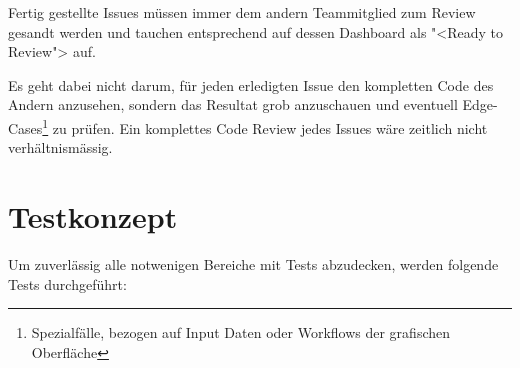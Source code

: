 		Fertig gestellte Issues müssen immer dem andern Teammitglied
		zum Review gesandt werden und tauchen entsprechend auf dessen
		Dashboard als "<Ready to Review"> auf.
		
		Es geht dabei nicht darum, 
		für jeden erledigten Issue den kompletten Code des Andern anzusehen, 
		sondern das Resultat grob anzuschauen und eventuell
		Edge-Cases\footnote{Spezialfälle, bezogen auf Input Daten oder 
		Workflows der grafischen Oberfläche} zu prüfen. 
		Ein komplettes Code Review jedes Issues wäre zeitlich nicht verhältnismässig.
		
		
		\section{Testkonzept}
			\label{sec:testkonzept}
		
			Um zuverlässig alle notwenigen Bereiche mit Tests abzudecken, 
			werden folgende Tests durchgeführt:
			
